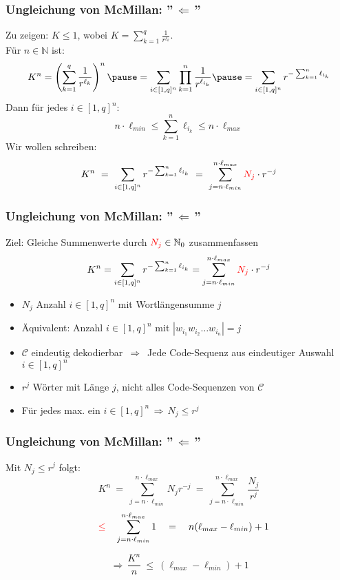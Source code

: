 \documentclass{beamer}
\begin{document}
\begin{frame}[t]
    \frametitle{Ungleichung von McMillan: ''$\,\Longleftarrow\,$''}
        Zu zeigen: $K \leq 1$, wobei
        $\displaystyle
            K = \sum_{k=1}^{q} \frac{1}{r^{\ell_k}}
        $.\\
        \pause
        Für $n \in \mathbb{N}$ ist:
        $$
            K^n = \left(\sum_{k=1}^{q} \frac{1}{r^{\ell_k}}\right)^n
            \pause
            = \sum_{i \in [1,q]^n} \prod_{k=1}^{n} \frac{1}{r^{\ell_{i_k}}}
            \pause
            = \sum_{i\in [1,q]^n} r^{-\sum_{k=1}^{n} \ell_{i_k}}
        $$\pause
        Dann für jedes $i \in [1,q]^n:$
        $$
            n\cdot \ell_{min} \leq \sum_{k=1}^{n} \ell_{i_k} \leq n\cdot \ell_{max}
        $$
        \pause
        Wir wollen schreiben:
        $$
            K^n
            \ =\ \sum_{i\in [1,q]^n} r^{-\sum_{k=1}^{n} \ell_{i_k}}
            \ =\ \sum_{j=n\cdot \ell_{min}}^{n\cdot \ell_{max}} {\color{red}N_j}\cdot r^{-j}
        $$
\end{frame}

\begin{frame}[t]
    \frametitle{Ungleichung von McMillan: ''$\,\Longleftarrow\,$''}
    Ziel: Gleiche Summenwerte durch ${\color{red}N_j} \in \mathbb{N}_0$ zusammenfassen
    $$
        K^n = \sum_{i\in [1,q]^n} r^{-\sum_{k=1}^{n} \ell_{i_k}}
        = \sum_{j=n\cdot\ell_{min}}^{n\cdot\ell_{max}} {\color{red}N_j} \cdot r^{-j}
    $$
    \pause

    \begin{itemize}
        \setlength\itemsep{1em}
        \item $N_j$ Anzahl $i \in [1,q]^n$ mit Wortlängensumme $j$
        \pause
        \item Äquivalent: Anzahl $i \in [1,q]^n$ mit $|w_{i_1}w_{i_2}\dots w_{i_n}| = j$
        \pause
        \item $\mathcal{C}$ eindeutig dekodierbar
            $\,\Longrightarrow\,$ Jede Code-Sequenz aus eindeutiger Auswahl
                $i \in [1,q]^n$
        \pause
    \item $r^j$ Wörter mit Länge $j$, nicht alles Code-Sequenzen von $\mathcal{C}$
    \item Für jedes max. ein $i \in [1,q]^n \,\Longrightarrow\, N_j \leq r^j$
    \end{itemize}

\end{frame}

\begin{frame}[t]
    \frametitle{Ungleichung von McMillan: ''$\,\Longleftarrow\,$''}
        Mit {$N_j \leq r^j$} folgt:
        $$
            K^n
            \ =\ \sum_{j = n\cdot \ell_{min}}^{n\cdot \ell_{max}} N_jr^{-j}
            \ =\ \sum_{j = n\cdot\ell_{min}}^{n\cdot\ell_{max}} \frac{N_j}{r^j}
        $$
        \pause
        $$
            \quad{\color{red}\leq}\quad \sum_{j = n\cdot\ell_{min}}^{n\cdot\ell_{max}} 1
            \quad=\quad n(\ell_{max}-\ell_{min}) + 1
        $$
        \pause
        \strut
        $$
            \,\Longrightarrow\, \frac{K^n}{n}\ \leq\ (\ell_{max}-\ell_{min}) + 1
        $$
\end{frame}
\end{document}
